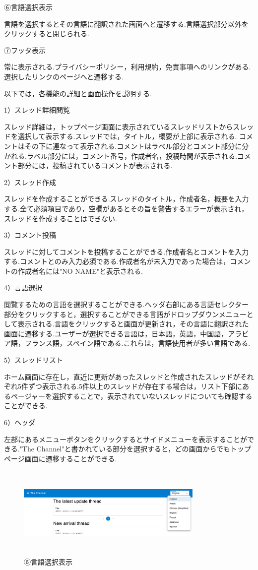 \documentclass[b5paper,12pt]{jsreport}
\begin{document}
⑥言語選択表示

言語を選択するとその言語に翻訳された画面へと遷移する.言語選択部分以外をクリックすると閉じられる.

⑦フッタ表示

常に表示される.プライバシーポリシー，利用規約，免責事項へのリンクがある.選択したリンクのページへと遷移する.

以下では，各機能の詳細と画面操作を説明する.

1）スレッド詳細閲覧

スレッド詳細は，トップページ画面に表示されているスレッドリストからスレッドを選択して表示する.スレッドでは，タイトル，概要が上部に表示される.
コメントはその下に連なって表示される.コメントはラベル部分とコメント部分に分かれる.ラベル部分には，コメント番号，作成者名，投稿時間が表示される.コメント部分には，投稿されているコメントが表示される.

2）スレッド作成

スレッドを作成することができる.スレッドのタイトル，作成者名，概要を入力する.全て必須項目であり，空欄があるとその旨を警告するエラーが表示され，スレッドを作成することはできない.

3）コメント投稿

スレッドに対してコメントを投稿することができる.作成者名とコメントを入力する.コメントとのみ入力必須である.作成者名が未入力であった場合は，コメントの作成者名には"NO NAME"と表示される.

4）言語選択

閲覧するための言語を選択することができる.ヘッダ右部にある言語セレクター部分をクリックすると，選択することができる言語がドロップダウンメニューとして表示される.言語をクリックすると画面が更新され，その言語に翻訳された画面に遷移する.ユーザーが選択できる言語は，日本語，英語，中国語，アラビア語，フランス語，スペイン語である.これらは，言語使用者が多い言語である.

5）スレッドリスト

ホーム画面に存在し，直近に更新があったスレッドと作成されたスレッドがそれぞれ5件ずつ表示される.5件以上のスレッドが存在する場合は，リスト下部にあるページャーを選択することで，表示されていないスレッドについても確認することができる.

6）ヘッダ

左部にあるメニューボタンをクリックするとサイドメニューを表示することができる."The Channel"と書かれている部分を選択すると，どの画面からでもトップページ画面に遷移することができる.


\begin{figure}[htbp]
	\centering
	\includegraphics[width=90mm,height=45mm]{./img/select_language.png}

	\caption*{⑥言語選択表示}
\end{figure}
\end{document}

